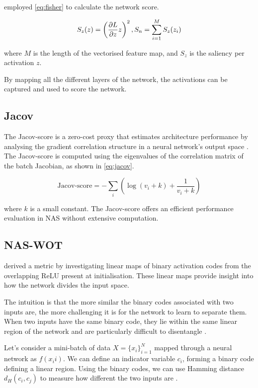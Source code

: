 \cite{DBLP:journals/corr/abs-1801-05787} employed \cref{eq:fisher} to calculate the network score. 

\begin{equation}
    \centering
    S_z(z) = \left(\frac{\partial L}{\partial z}z\right)^2, S_n = \sum_{i=1}^M S_z(z_i)
    \label{eq:fisher}
\end{equation}

where $M$ is the length of the vectorised feature map, and  $S_z$ is the saliency per activation $z$. 

By mapping all the different layers of the network, the activations can be captured and used to score the network.  

\subsection{Jacov}
The Jacov-score is a zero-cost proxy that estimates architecture performance by analysing the gradient correlation structure in a neural network's output space \autocite{jacob_conv}. The Jacov-score is computed using the eigenvalues of the correlation matrix of the batch Jacobian, as shown in \cref{eq:jacov}. 

\begin{equation}
\text{Jacov-score}=-\sum_i \left( \log(v_i+k)+\frac{1}{v_i+k}\right)
\label{eq:jacov}
\end{equation}

where $k$ is a small constant. The Jacov-score offers an efficient performance evaluation in NAS without extensive computation.


\subsection{NAS-WOT}

\autocite{jacob_conv} derived a metric by investigating linear maps of binary activation codes from the overlapping ReLU present at initialisation. These linear maps provide insight into how the network divides the input space.

The intuition is that the more similar the binary codes associated with two inputs are, the more challenging it is for the network to learn to separate them. When two inputs have the same binary code, they lie within the same linear region of the network and are particularly difficult to disentangle \autocite{jacob_conv}.

Let's consider a mini-batch of data $X = \{x_i\}^N_{i=1}$ mapped through a neural network as $f(x_ii)$. We can define an indicator variable $c_i$, forming a binary code defining a linear region. Using the binary codes, we can use Hamming distance $d_H(c_i, c_j)$ to measure how different the two inputs are \autocite{jacob_conv}.

